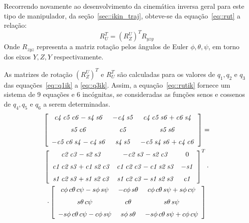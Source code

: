 Recorrendo novamente ao desenvolvimento da cinemática inversa geral para este
tipo de manipulador, da seção~\ref{sec::ikin_traj}, obteve-se da
equação~\ref{eq::rut} a relação:
%
\begin{equation*}
	R_{U}^{T} = (R_{Z}^{U})^T R_{yzy}
\end{equation*}
%
Onde $R_{zyz}$ representa a matriz rotação pelos ângulos de Euler
$\phi,\theta,\psi$, em torno dos eixos $Y,Z,Y$ respectivamente.

As matrizes de rotação $(R_{Z}^{U})^T$ e $R_{U}^{T}$ são calculadas para os
valores de $q_1, q_2$ e $q_3$ das equações~\ref{eq::q1ik} a \ref{eq::q3ik}.
Assim, a equação~\ref{eq::rutik} fornece um sistema de 9 equações e 6
incógnitas, se consideradas as funções senos e cossenos de $q_4, q_5$ e $q_6$ a serem
determinadas.
%
\begin{multline} \label{eq::rut}
	 \left[ \begin {array}{ccc} {\it c4}\,{\it c5}\,{\it c6}-{\it s4}\,{
\it s6}&-{\it c4}\,{\it s5}&{\it c4}\,{\it c5}\,{\it s6}+{\it c6}\,{
\it s4}\\ \noalign{\medskip}{\it s5}\,{\it c6}&{\it c5}&{\it s5}\,{
\it s6}\\ \noalign{\medskip}-{\it c5}\,{\it c6}\,{\it s4}-{\it c4}\,{
\it s6}&{\it s4}\,{\it s5}&-{\it c5}\,{\it s4}\,{\it s6}+{\it c4}\,{
\it c6}\end {array} \right] = \\
	 \left[ \begin {array}{ccc} {\it c2}\,{\it c3}-{\it s2}\,{\it s3}&-{
\it c2}\,{\it s3}-{\it s2}\,{\it c3}&0\\ \noalign{\medskip}{\it c1}\,{
\it c2}\,{\it s3}+{\it c1}\,{\it s2}\,{\it c3}&{\it c1}\,{\it c2}\,{
\it c3}-{\it c1}\,{\it s2}\,{\it s3}&-{\it s1}\\ \noalign{\medskip}{
\it s1}\,{\it c2}\,{\it s3}+{\it s1}\,{\it s2}\,{\it c3}&{\it s1}\,{
\it c2}\,{\it c3}-{\it s1}\,{\it s2}\,{\it s3}&{\it c1}\end {array}
 \right]^T \cdot \\
	\cdot \left[ \begin {array}{ccc} c\phi \,c\theta \,c\psi -s\phi \,s\psi &-c
\phi \,s\theta &c\phi \,c\theta \,s\psi +s\phi \,c\psi 
\\ \noalign{\medskip}s\theta \,c\psi &c\theta &s\theta \,s\psi 
\\ \noalign{\medskip}-s\phi \,c\theta \,c\psi -c\phi \,s\psi &s\phi \,
s\theta &-s\phi \,c\theta \,s\psi +c\phi \,c\psi \end {array} \right] 
\end{multline}
%

